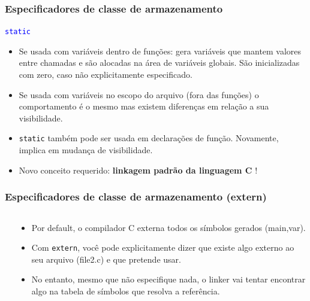 \documentclass{beamer}
\begin{document}
\begin{frame}
	\frametitle{Especificadores de classe de armazenamento}
		\begin{center}
		\texttt{\textcolor{blue}{static}}
		\end{center}
		\vspace*{0.5cm}
		\begin{itemize}
			\item Se usada com variáveis dentro de funções: gera variáveis que mantem valores entre chamadas e são alocadas na área de variáveis globais. São inicializadas com zero, caso não explicitamente especificado.
			\item Se usada com variáveis no escopo do arquivo (fora das funções) o comportamento é o mesmo mas existem diferenças em relação a sua visibilidade.
			\item \texttt{static} também pode ser usada em declarações de função. Novamente, implica em mudança de visibilidade.
			\item Novo conceito requerido: \textbf{linkagem padrão da linguagem C} !
		\end{itemize}
\end{frame}

\begin{frame}
	\frametitle{Especificadores de classe de armazenamento (extern)}
	\begin{columns}[T] %
		\begin{column}{.57\textwidth}
			
			
		\end{column}%
		\hfill%
		\begin{column}{.43\textwidth}
			\begin{itemize}
				\item Por default, o compilador C externa todos os símbolos gerados (main,var).
				\item Com \texttt{extern}, você pode explicitamente dizer que existe algo externo ao seu arquivo (file2.c) e que pretende usar.
			\item No entanto, mesmo que não especifique nada, o linker vai tentar encontrar algo na tabela de símbolos que resolva a referência.
			\end{itemize}
		\end{column}%
	\end{columns}
\end{frame}
\end{document}
